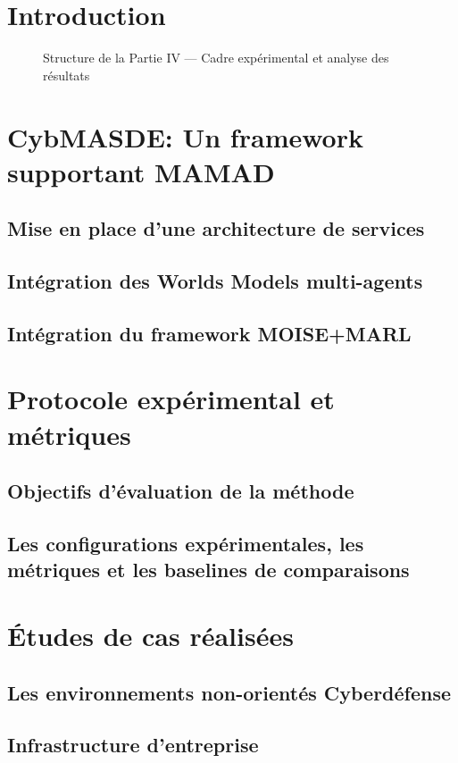 \documentclass[ twoside,openright,titlepage,numbers=noenddot,headinclude,%
                footinclude=true,cleardoublepage=empty,abstractoff, %
                BCOR=5mm,paper=a4,fontsize=11pt,%
                french,american,%
                ]{scrreprt}
\begin{document}
\chapter*{Introduction}

\begin{figure}[h!]
    \centering
    
    \caption{Structure de la Partie IV — Cadre expérimental et analyse des résultats}
\end{figure}

\chapter{CybMASDE: Un framework supportant MAMAD}
\section{Mise en place d'une architecture de services}
\section{Intégration des Worlds Models multi-agents}
\section{Intégration du framework MOISE+MARL}

\chapter{Protocole expérimental et métriques}
\section{Objectifs d'évaluation de la méthode}
\section{Les configurations expérimentales, les métriques et les baselines de comparaisons}

\chapter{Études de cas réalisées}
\section{Les environnements non-orientés Cyberdéfense}
\section{Infrastructure d'entreprise}
\end{document}
